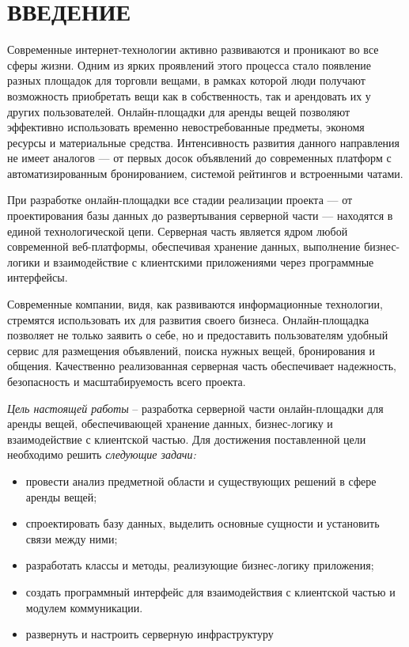\section*{ВВЕДЕНИЕ}

Современные интернет-технологии активно развиваются и проникают во все сферы жизни. Одним из ярких проявлений этого процесса стало появление разных площадок для торговли вещами, в рамках которой люди получают возможность приобретать вещи как в собственность, так и арендовать их у других пользователей. Онлайн-площадки для аренды вещей позволяют эффективно использовать временно невостребованные предметы, экономя ресурсы и материальные средства. Интенсивность развития данного направления не имеет аналогов — от первых досок объявлений до современных платформ с автоматизированным бронированием, системой рейтингов и встроенными чатами.

При разработке онлайн-площадки все стадии реализации проекта — от проектирования базы данных до развертывания серверной части — находятся в единой технологической цепи. Серверная часть является ядром любой современной веб-платформы, обеспечивая хранение данных, выполнение бизнес-логики и взаимодействие с клиентскими приложениями через программные интерфейсы.

Современные компании, видя, как развиваются информационные технологии, стремятся использовать их для развития своего бизнеса. Онлайн-площадка позволяет не только заявить о себе, но и предоставить пользователям удобный сервис для размещения объявлений, поиска нужных вещей, бронирования и общения. Качественно реализованная серверная часть обеспечивает надежность, безопасность и масштабируемость всего проекта.

\emph{Цель настоящей работы} – разработка серверной части онлайн-площадки для аренды вещей, обеспечивающей хранение данных, бизнес-логику и взаимодействие с клиентской частью. Для достижения поставленной цели необходимо решить \emph{следующие задачи:}
\begin{itemize}
\item провести анализ предметной области и существующих решений в сфере аренды вещей;
\item спроектировать базу данных, выделить основные сущности и установить связи между ними;
\item разработать классы и методы, реализующие бизнес-логику приложения;
\item создать программный интерфейс для взаимодействия с клиентской частью и модулем коммуникации.
\item развернуть и настроить серверную инфраструктуру
\end{itemize}

